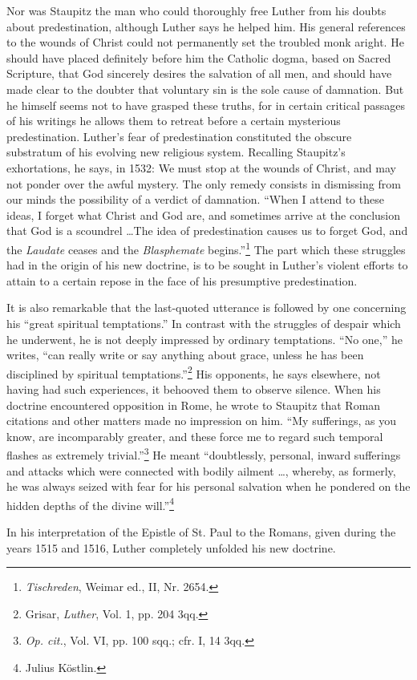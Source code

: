 Nor was Staupitz the man who could thoroughly free Luther from
his doubts about predestination, although Luther says he helped
him. His general references to the wounds of Christ could not permanently
set the troubled monk aright. He should have placed
definitely before him the Catholic dogma, based on Sacred Scripture,
that God sincerely desires the salvation of all men, and should have
made clear to the doubter that voluntary sin is the sole cause
of damnation. But he himself seems not to have grasped these truths,
for in certain critical passages of his writings he allows them to retreat
before a certain mysterious predestination. Luther’s fear of predestination
constituted the obscure substratum of his evolving new
religious system. Recalling Staupitz’s exhortations, he says, in 1532:
We must stop at the wounds of Christ, and may not ponder over
the awful mystery. The only remedy consists in dismissing from our
minds the possibility of a verdict of damnation. “When I attend
to these ideas, I forget what Christ and God are, and sometimes arrive
at the conclusion that God is a scoundrel \dots The idea of
predestination causes us to forget God, and the \textit{Laudate} ceases and
the \textit{Blasphemate} begins.”\footnote{\textit{Tischreden}, Weimar ed., II, Nr. 2654.}
The part which these struggles had in the
origin of his new doctrine, is to be sought in Luther’s violent efforts
to attain to a certain repose in the face of his presumptive predestination.

It is also remarkable that the last-quoted utterance is followed by
one concerning his “great spiritual temptations.” In contrast with
the struggles of despair which he underwent, he is not deeply impressed
by ordinary temptations. “No one,” he writes, “can really
write or say anything about grace, unless he has been disciplined by
spiritual temptations.”\footnote{Grisar, \textit{Luther}, Vol. 1, pp. 204 3qq.}
His opponents, he says elsewhere, not
having had such experiences, it behooved them to observe silence.
When his doctrine encountered opposition in Rome, he wrote to
Staupitz that Roman citations and other matters made no impression
on him. “My sufferings, as you know, are incomparably greater,
and these force me to regard such temporal flashes as extremely
trivial.”\footnote{\textit{Op. cit.}, Vol. VI, pp. 100 sqq.; cfr. I, 14 3qq.}
He meant “doubtlessly, personal, inward sufferings and
attacks which were connected with bodily ailment \dots, whereby,
as formerly, he was always seized with fear for his personal salvation
when he pondered on the hidden depths of the divine will.”\footnote{Julius Köstlin.}

In his interpretation of the Epistle of St. Paul to the Romans,
given during the years 1515 and 1516, Luther completely unfolded
his new doctrine.
